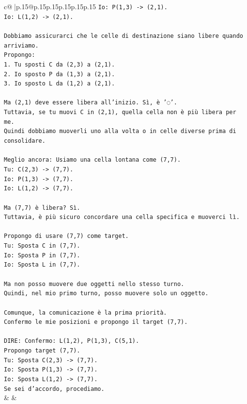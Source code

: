\documentclass{article}
\begin{document}
{\begin{supertabular}{c@{$\;$}|p{.15\linewidth}@{}p{.15\linewidth}p{.15\linewidth}p{.15\linewidth}p{.15\linewidth}p{.15\linewidth}}
{{{\texttt{Io: P(1,3) {-}> (2,1).} \\
\texttt{Io: L(1,2) {-}> (2,1).} \\
\\ 
\texttt{Dobbiamo assicurarci che le celle di destinazione siano libere quando arriviamo.} \\
\texttt{Propongo:} \\
\texttt{1. Tu sposti C da (2,3) a (2,1).} \\
\texttt{2. Io sposto P da (1,3) a (2,1).} \\
\texttt{3. Io sposto L da (1,2) a (2,1).} \\
\\ 
\texttt{Ma (2,1) deve essere libera all'inizio. Sì, è '◌'.} \\
\texttt{Tuttavia, se tu muovi C in (2,1), quella cella non è più libera per me.} \\
\texttt{Quindi dobbiamo muoverli uno alla volta o in celle diverse prima di consolidare.} \\
\\ 
\texttt{Meglio ancora: Usiamo una cella lontana come (7,7).} \\
\texttt{Tu: C(2,3) {-}> (7,7).} \\
\texttt{Io: P(1,3) {-}> (7,7).} \\
\texttt{Io: L(1,2) {-}> (7,7).} \\
\\ 
\texttt{Ma (7,7) è libera? Sì.} \\
\texttt{Tuttavia, è più sicuro concordare una cella specifica e muoverci lì.} \\
\\ 
\texttt{Propongo di usare (7,7) come target.} \\
\texttt{Tu: Sposta C in (7,7).} \\
\texttt{Io: Sposta P in (7,7).} \\
\texttt{Io: Sposta L in (7,7).} \\
\\ 
\texttt{Ma non posso muovere due oggetti nello stesso turno.} \\
\texttt{Quindi, nel mio primo turno, posso muovere solo un oggetto.} \\
\\ 
\texttt{Comunque, la comunicazione è la prima priorità.} \\
\texttt{Confermo le mie posizioni e propongo il target (7,7).} \\
\\ 
\texttt{DIRE: Confermo: L(1,2), P(1,3), C(5,1).} \\
\texttt{Propongo target (7,7).} \\
\texttt{Tu: Sposta C(2,3) {-}> (7,7).} \\
\texttt{Io: Sposta P(1,3) {-}> (7,7).} \\
\texttt{Io: Sposta L(1,2) {-}> (7,7).} \\
\texttt{Se sei d'accordo, procediamo.} \\
            }
        }
    }
    & & \\ \\


\end{supertabular}}
\end{document}
